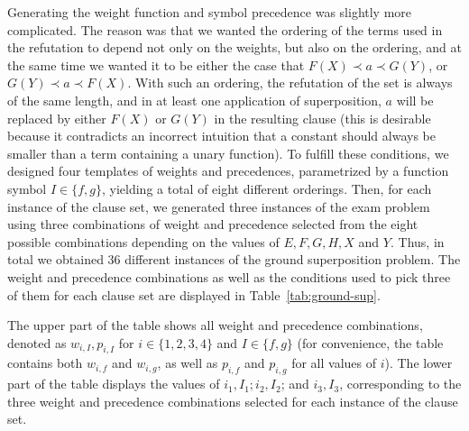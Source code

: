 Generating the weight function and symbol precedence was slightly more
complicated. The reason was that we wanted the ordering of the terms used
in the refutation to depend not only on the weights, but also on the ordering,
and at the same time we wanted it to be either
the case that $F(X) \prec a \prec G(Y)$, or $G(Y) \prec a \prec F(X)$. With such an ordering,
the refutation of the set is always of the same length, and in
at least one application of superposition, $a$ will be replaced by either $F(X)$ or $G(Y)$
in the resulting clause (this is desirable because it contradicts
an incorrect intuition that a constant should always be smaller than a term
containing a unary function).
To fulfill these conditions, we designed four templates of weights and precedences,
parametrized by a function symbol $I \in \{f, g\}$, yielding a total of eight
different orderings.
Then, for each instance of the clause set, we generated three instances of the exam problem
using three combinations of weight and precedence selected from the eight possible combinations
depending on the values of $E, F, G, H, X$ and $Y$.
Thus, in total we obtained 36 different instances of the ground superposition problem.
The weight and precedence combinations as well as the conditions used to pick
three of them for each clause set are displayed in Table~\ref{tab:ground-sup}.


The upper part of the table shows all weight and precedence combinations,
denoted as $w_{i, I}, p_{i, I}$ for $i \in \{1, 2, 3, 4\}$
and $I \in \{f, g\}$ (for convenience, the table contains both $w_{i, f}$ and $w_{i, g}$, as well as
$p_{i, f}$ and $p_{i, g}$ for all values of $i$).
The lower part of the table displays the values of $i_1, I_1; i_2, I_2$; and $i_3, I_3$,
corresponding to the three weight and precedence combinations selected for
each instance of the clause set.

